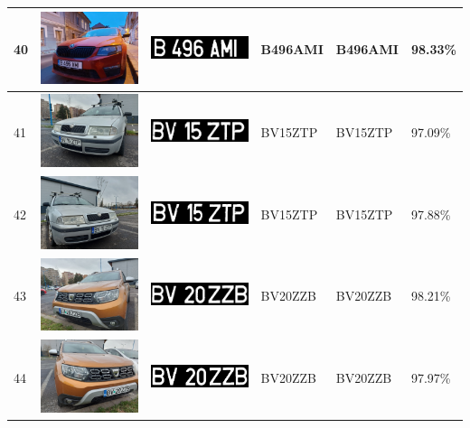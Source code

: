 \documentclass[a4paper,12pt]{report}
\begin{document}
\begin{longtable}{| m{0.6cm} | m{3cm} | m{3cm} | m{1.8cm} | m{1.8cm} | m{1.8cm} |}
        40 & \includegraphics[width=3cm,keepaspectratio]{dataset/23_d1.jpg} & \includegraphics[width=3cm,keepaspectratio]{segmentari/40.jpg} & B496AMI & B496AMI & 98.33\% \\ \hline
        41 & \includegraphics[width=3cm,keepaspectratio]{dataset/24_d1.jpg} & \includegraphics[width=3cm,keepaspectratio]{segmentari/41.jpg} & BV15ZTP & BV15ZTP & 97.09\% \\ \hline
        42 & \includegraphics[width=3cm,keepaspectratio]{dataset/24_s1.jpg} & \includegraphics[width=3cm,keepaspectratio]{segmentari/42.jpg} & BV15ZTP & BV15ZTP & 97.88\% \\ \hline
        43 & \includegraphics[width=3cm,keepaspectratio]{dataset/25_d1.jpg} & \includegraphics[width=3cm,keepaspectratio]{segmentari/43.jpg} & BV20ZZB & BV20ZZB & 98.21\% \\ \hline
        44 & \includegraphics[width=3cm,keepaspectratio]{dataset/25_s1.jpg} & \includegraphics[width=3cm,keepaspectratio]{segmentari/44.jpg} & BV20ZZB & BV20ZZB & 97.97\% \\ \hline

\end{longtable}
\end{document}
